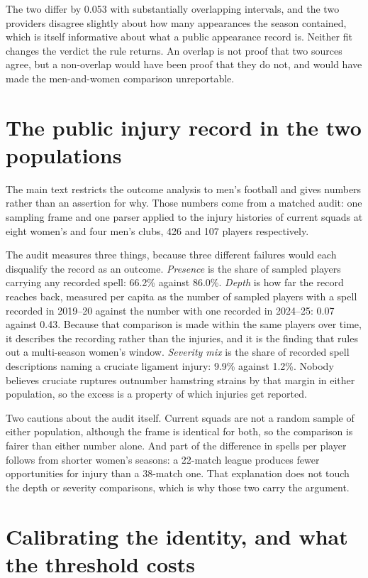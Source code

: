 \documentclass[11pt]{article}
\begin{document}
The two differ by 0.053 with substantially overlapping intervals, and the two providers disagree slightly about how many appearances the season contained, which is itself informative about what a public appearance record is. Neither fit changes the verdict the rule returns. An overlap is not proof that two sources agree, but a non-overlap would have been proof that they do not, and would have made the men-and-women comparison unreportable.

\section{The public injury record in the two populations}

The main text restricts the outcome analysis to men's football and gives numbers rather than an assertion for why. Those numbers come from a matched audit: one sampling frame and one parser applied to the injury histories of current squads at eight women's and four men's clubs, 426 and 107 players respectively.

The audit measures three things, because three different failures would each disqualify the record as an outcome. \emph{Presence} is the share of sampled players carrying any recorded spell: 66.2\% against 86.0\%. \emph{Depth} is how far the record reaches back, measured per capita as the number of sampled players with a spell recorded in 2019--20 against the number with one recorded in 2024--25: 0.07 against 0.43. Because that comparison is made within the same players over time, it describes the recording rather than the injuries, and it is the finding that rules out a multi-season women's window. \emph{Severity mix} is the share of recorded spell descriptions naming a cruciate ligament injury: 9.9\% against 1.2\%. Nobody believes cruciate ruptures outnumber hamstring strains by that margin in either population, so the excess is a property of which injuries get reported.

Two cautions about the audit itself. Current squads are not a random sample of either population, although the frame is identical for both, so the comparison is fairer than either number alone. And part of the difference in spells per player follows from shorter women's seasons: a 22-match league produces fewer opportunities for injury than a 38-match one. That explanation does not touch the depth or severity comparisons, which is why those two carry the argument.

\section{Calibrating the identity, and what the threshold costs}
\end{document}
